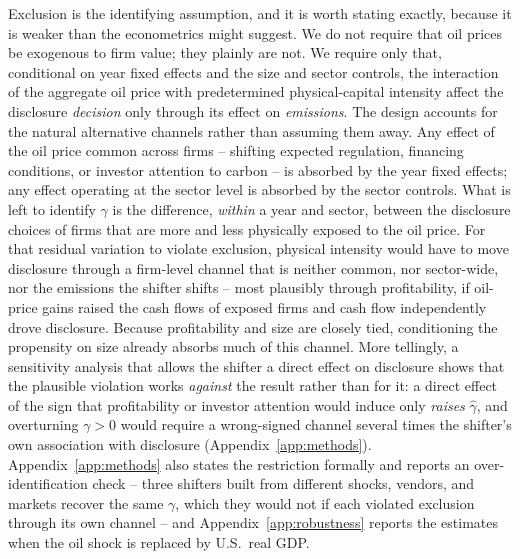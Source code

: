 \documentclass[a4paper,12pt]{article}
\newcommand{\citep}[1]{\parencite{#1}}
\begin{document}
Exclusion is the identifying assumption, and it is worth stating exactly, because it is weaker than the econometrics might suggest. We do not require that oil prices be exogenous to firm value; they plainly are not. We require only that, conditional on year fixed effects and the size and sector controls, the interaction of the aggregate oil price with predetermined physical-capital intensity affect the disclosure \emph{decision} only through its effect on \emph{emissions}. The design accounts for the natural alternative channels rather than assuming them away. Any effect of the oil price common across firms -- shifting expected regulation, financing conditions, or investor attention to carbon -- is absorbed by the year fixed effects; any effect operating at the sector level is absorbed by the sector controls. What is left to identify $\gamma$ is the difference, \emph{within} a year and sector, between the disclosure choices of firms that are more and less physically exposed to the oil price. For that residual variation to violate exclusion, physical intensity would have to move disclosure through a firm-level channel that is neither common, nor sector-wide, nor the emissions the shifter shifts -- most plausibly through profitability, if oil-price gains raised the cash flows of exposed firms and cash flow independently drove disclosure. Because profitability and size are closely tied, conditioning the propensity on size already absorbs much of this channel. More tellingly, a sensitivity analysis that allows the shifter a direct effect on disclosure \citep{conley2012plausibly} shows that the plausible violation works \emph{against} the result rather than for it: a direct effect of the sign that profitability or investor attention would induce only \emph{raises} $\hat\gamma$, and overturning $\gamma>0$ would require a wrong-signed channel several times the shifter's own association with disclosure (Appendix~\ref{app:methods}). Appendix~\ref{app:methods} also states the restriction formally and reports an over-identification check -- three shifters built from different shocks, vendors, and markets recover the same $\gamma$, which they would not if each violated exclusion through its own channel -- and Appendix~\ref{app:robustness} reports the estimates when the oil shock is replaced by U.S.\ real GDP.
\end{document}

